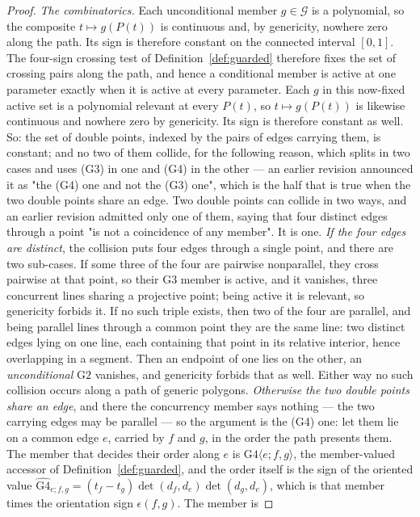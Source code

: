\begin{proof}
\emph{The combinatorics.} Each unconditional member $g\in\mathcal G$ is a
polynomial, so the composite $t\mapsto g(P(t))$ is continuous and, by genericity,
nowhere zero along the path. Its sign is therefore constant on the connected
interval $[0,1]$. The four-sign crossing test of
Definition~\ref{def:guarded} therefore fixes the set of crossing pairs
along the path, and hence a conditional member is active at one parameter
exactly when it is active at every parameter. Each $g$ in this now-fixed active
set is a polynomial relevant at every $P(t)$, so $t\mapsto g(P(t))$ is likewise
continuous and nowhere zero by genericity. Its sign is therefore constant as
well. So: the set of double points, indexed by the pairs of edges carrying them, is
constant; and no two of them collide, for the following reason, which splits in
two cases and uses (G3) in one and (G4) in the other --- an earlier revision
announced it as "the (G4) one and not the (G3) one", which is the half that is
true when the two double points share an edge. Two double points can collide in two ways, and an earlier revision admitted
only one of them, saying that four distinct edges through a point "is not a
coincidence of any member". It is one. \emph{If the four edges are distinct}, the collision puts four edges through a
single point, and there are two sub-cases. If some three of the four are
pairwise nonparallel, they cross pairwise at that point, so their
$\mathrm{G3}$ member is active, and it vanishes, three concurrent lines sharing
a projective point; being active it is relevant, so genericity forbids it. If
no such triple exists, then two of the four are parallel, and being parallel
lines through a common point they are the same line: two distinct edges lying
on one line, each containing that point in its relative interior, hence
overlapping in a segment. Then an endpoint of one lies on the other, an
\emph{unconditional} $\mathrm{G2}$ vanishes, and genericity forbids that as
well. Either way no such collision occurs along a path of generic polygons.
\emph{Otherwise the two double points share an edge}, and there the concurrency
member says nothing --- the two carrying edges may be parallel --- so the
argument is the (G4) one: let them lie on a common edge
$e$, carried by $f$ and $g$, in the order the path presents them. The member
that decides their order along $e$ is
$\mathrm{G4}\langle e;f,g\rangle$, the member-valued accessor of
Definition~\ref{def:guarded}, and the order itself is the sign of the oriented
value $\widehat{\mathrm{G4}}_{e;f,g}=(t_f-t_g)\det(d_f,d_e)\det(d_g,d_e)$,
which is that member times the orientation sign $\epsilon(f,g)$. The member is

\end{proof}
